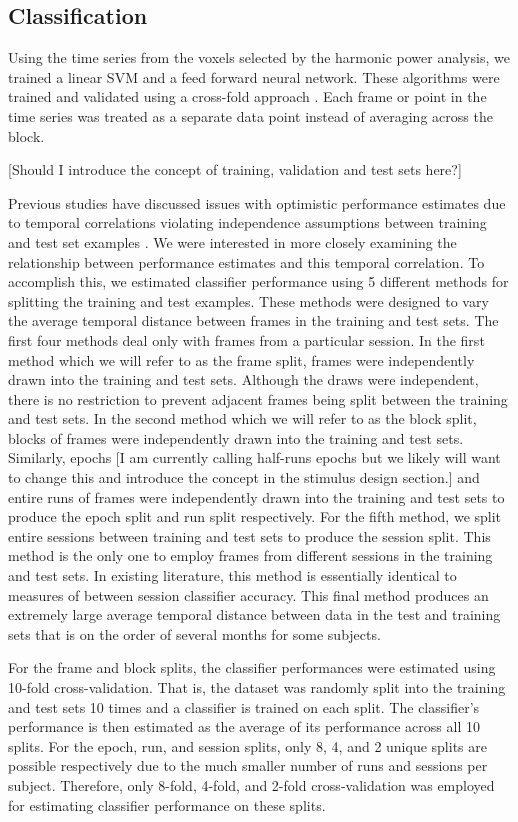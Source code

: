 \documentclass[final]{article}
\begin{document}
\subsection{Classification}
Using the time series from the voxels selected by the harmonic power analysis, we trained a linear SVM and a feed forward neural network.
These algorithms were trained and validated using a cross-fold approach \cite{Kohavi1995}.
Each frame or point in the time series was treated as a separate data point instead of averaging across the block.

[Should I introduce the concept of training, validation and test sets here?]

Previous studies have discussed issues with optimistic performance estimates due to temporal correlations violating independence assumptions between training and test set examples \cite{Pereira2009}.
We were interested in more closely examining the relationship between performance estimates and this temporal correlation.
To accomplish this, we estimated classifier performance using 5 different methods for splitting the training and test examples.
These methods were designed to vary the average temporal distance between frames in the training and test sets.
The first four methods deal only with frames from a particular session.
In the first method which we will refer to as the frame split, frames were independently drawn into the training and test sets.
Although the draws were independent, there is no restriction to prevent adjacent frames being split between the training and test sets.
In the second method which we will refer to as the block split, blocks of frames were independently drawn into the training and test sets.
Similarly, epochs [I am currently calling half-runs epochs but we likely will want to change this and introduce the concept in the stimulus design section.] and entire runs of frames were independently drawn into the training and test sets to produce the epoch split and run split respectively.
For the fifth method, we split entire sessions between training and test sets to produce the session split.
This method is the only one to employ frames from different sessions in the training and test sets.
In existing literature, this method is essentially identical to measures of between session classifier accuracy.
This final method produces an extremely large average temporal distance between data in the test and training sets that is on the order of several months for some subjects.

For the frame and block splits, the classifier performances were estimated using 10-fold cross-validation.
That is, the dataset was randomly split into the training and test sets 10 times and a classifier is trained on each split.
The classifier's performance is then estimated as the average of its performance across all 10 splits.
For the epoch, run, and session splits, only 8, 4, and 2 unique splits are possible respectively due to the much smaller number of runs and sessions per subject.
Therefore, only 8-fold, 4-fold, and 2-fold cross-validation was employed for estimating classifier performance on these splits.
\end{document}
